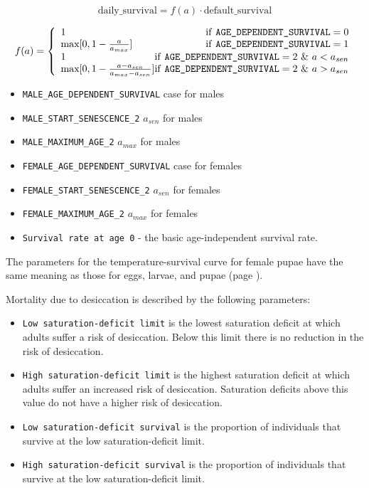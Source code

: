 \documentclass[11pt]{article}
\newcommand{\linecmd}[1]{\texttt{#1}}
\begin{document}
$$ \mbox{daily\_survival}=f(a)\cdot \mbox{default\_survival} $$

\[f(a)= \left\{
	\begin{array}{lr}
		1 \hfill \mbox{if \linecmd{AGE\_DEPENDENT\_SURVIVAL}}=0\\
		\mbox{max}[0, 1-\frac{a}{a_{max}}] \hfill \mbox{if \linecmd{AGE\_DEPENDENT\_SURVIVAL}}=1\\
		1 \hfill \mbox{if \linecmd{AGE\_DEPENDENT\_SURVIVAL}}=2 \mbox{ }\&\mbox{ } a<a_{sen}\\
		\mbox{max}[0, 1-\frac{a-a_{sen}}{a_{max}-a_{sen}}] \hfill \mbox{if \linecmd{AGE\_DEPENDENT\_SURVIVAL}}=2 \mbox{ }\&\mbox{ } a>a_{sen}\end{array}
\right.
\]

\begin{itemize}
	\item \linecmd{MALE\_AGE\_DEPENDENT\_SURVIVAL} case for males
	\item \linecmd{MALE\_START\_SENESCENCE\_2} $a_{sen}$ for males
	\item \linecmd{MALE\_MAXIMUM\_AGE\_2} $a_{max}$ for males
	\item \linecmd{FEMALE\_AGE\_DEPENDENT\_SURVIVAL} case for females
	\item \linecmd{FEMALE\_START\_SENESCENCE\_2} $a_{sen}$ for females
	\item \linecmd{FEMALE\_MAXIMUM\_AGE\_2} $a_{max}$ for females
	\item \linecmd{Survival rate at age 0} - the basic age-independent survival rate.
\end{itemize}

The parameters for the temperature-survival curve for female pupae have the same meaning as those for eggs, larvae, and pupae (page \pageref{tempsurv}).

Mortality due to desiccation is described by the following parameters:
\begin{itemize}
	\item \linecmd{Low saturation-deficit limit} is the lowest saturation deficit at which adults suffer a risk of desiccation. Below this limit there is no reduction in the risk of desiccation.
	\item \linecmd{High saturation-deficit limit} is the highest saturation deficit at which adults suffer an increased risk of desiccation. Saturation deficits above this value do not have a higher risk of desiccation. 
	\item \linecmd{Low saturation-deficit survival} is the proportion of individuals that survive at the low saturation-deficit limit. 
	\item \linecmd{High saturation-deficit survival} is the proportion of individuals that survive at the low saturation-deficit limit.
\end{itemize}
\end{document}
